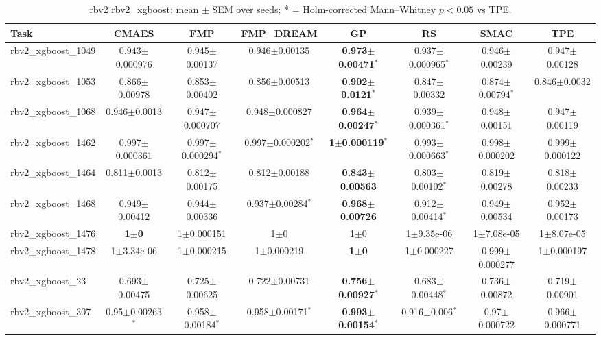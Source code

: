 \begin{table}[t]
\caption{rbv2 rbv2_xgboost: mean $\pm$ SEM over seeds; * = Holm-corrected Mann--Whitney $p<0.05$ vs TPE.}
\label{tab:rbv2_rbv2_xgboost}
\begin{center}\small
\begin{tabular}{lccccccc}
\hline
Task & CMAES & FMP & FMP\_DREAM & GP & RS & SMAC & TPE \\
\hline
rbv2\_xgboost\_1049 & 0.943$\pm$0.000976 & 0.945$\pm$0.00137 & 0.946$\pm$0.00135 & \textbf{0.973$\pm$0.00471}$^{*}$ & 0.937$\pm$0.000965$^{*}$ & 0.946$\pm$0.00239 & 0.947$\pm$0.00128 \\
rbv2\_xgboost\_1053 & 0.866$\pm$0.00978 & 0.853$\pm$0.00402 & 0.856$\pm$0.00513 & \textbf{0.902$\pm$0.0121}$^{*}$ & 0.847$\pm$0.00332 & 0.874$\pm$0.00794$^{*}$ & 0.846$\pm$0.0032 \\
rbv2\_xgboost\_1068 & 0.946$\pm$0.0013 & 0.947$\pm$0.000707 & 0.948$\pm$0.000827 & \textbf{0.964$\pm$0.00247}$^{*}$ & 0.939$\pm$0.000361$^{*}$ & 0.948$\pm$0.00151 & 0.947$\pm$0.00119 \\
rbv2\_xgboost\_1462 & 0.997$\pm$0.000361 & 0.997$\pm$0.000294$^{*}$ & 0.997$\pm$0.000202$^{*}$ & \textbf{1$\pm$0.000119}$^{*}$ & 0.993$\pm$0.000663$^{*}$ & 0.998$\pm$0.000202 & 0.999$\pm$0.000122 \\
rbv2\_xgboost\_1464 & 0.811$\pm$0.0013 & 0.812$\pm$0.00175 & 0.812$\pm$0.00188 & \textbf{0.843$\pm$0.00563} & 0.803$\pm$0.00102$^{*}$ & 0.819$\pm$0.00278 & 0.818$\pm$0.00233 \\
rbv2\_xgboost\_1468 & 0.949$\pm$0.00412 & 0.944$\pm$0.00336 & 0.937$\pm$0.00284$^{*}$ & \textbf{0.968$\pm$0.00726} & 0.912$\pm$0.00414$^{*}$ & 0.949$\pm$0.00534 & 0.952$\pm$0.00173 \\
rbv2\_xgboost\_1476 & \textbf{1$\pm$0} & 1$\pm$0.000151 & 1$\pm$0 & 1$\pm$0 & 1$\pm$9.35e-06 & 1$\pm$7.08e-05 & 1$\pm$8.07e-05 \\
rbv2\_xgboost\_1478 & 1$\pm$3.34e-06 & 1$\pm$0.000215 & 1$\pm$0.000219 & \textbf{1$\pm$0} & 1$\pm$0.000227 & 0.999$\pm$0.000277 & 1$\pm$0.000197 \\
rbv2\_xgboost\_23 & 0.693$\pm$0.00475 & 0.725$\pm$0.00625 & 0.722$\pm$0.00731 & \textbf{0.756$\pm$0.00927}$^{*}$ & 0.683$\pm$0.00448$^{*}$ & 0.736$\pm$0.00872 & 0.719$\pm$0.00901 \\
rbv2\_xgboost\_307 & 0.95$\pm$0.00263$^{*}$ & 0.958$\pm$0.00184$^{*}$ & 0.958$\pm$0.00171$^{*}$ & \textbf{0.993$\pm$0.00154}$^{*}$ & 0.916$\pm$0.006$^{*}$ & 0.97$\pm$0.000722 & 0.966$\pm$0.000771 \\

\end{tabular}
\end{center}
\end{table}
